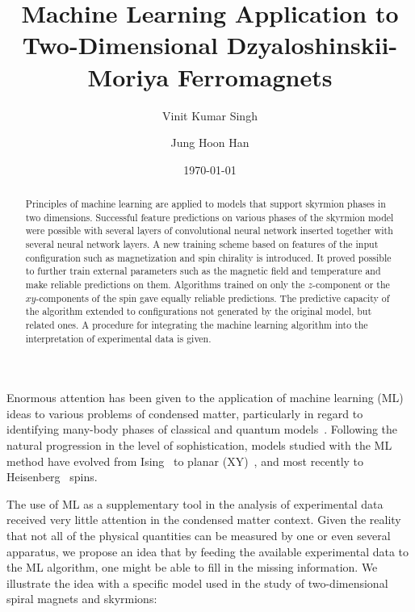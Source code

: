\documentclass[reprint,amsmath,amssymb,aps,showpacs,superscriptaddress,prl]{revtex4-1}
\begin{document}
%
\title{Machine Learning Application to Two-Dimensional Dzyaloshinskii-Moriya Ferromagnets}

\author{Vinit Kumar Singh}
\author{Jung Hoon Han}
\date{\today}

\begin{abstract}
Principles of machine learning are applied to models that support skyrmion phases in two dimensions. Successful feature predictions on various phases of the skyrmion model were possible with several layers of convolutional neural network inserted together with several neural network layers. A new training scheme based on features of the input configuration such as magnetization and spin chirality is introduced. It proved possible to further train external parameters such as the magnetic field and temperature and make reliable predictions on them. Algorithms trained on only the $z$-component or the $xy$-components of the spin gave equally reliable predictions. The predictive capacity of the algorithm extended to configurations not generated by the original model, but related ones. A procedure for integrating the machine learning algorithm into the interpretation of experimental data is given.
\end{abstract}
\maketitle

Enormous attention has been given to the application of machine learning (ML) ideas to various problems of condensed matter, particularly in regard to identifying many-body phases of classical and quantum models~\cite{melko16,wang16,melko17,melko17b,melko17c,tanaka17,scalettar17,wetzel17,wetzel17b,iso18,kim18,zhai17,scalettar17,beach18,zhai18,russian18}.
Following the natural progression in the level of sophistication, models studied with the ML method have evolved from Ising~\cite{melko16,wang16,melko17,melko17b,melko17c,tanaka17,scalettar17,wetzel17,wetzel17b,iso18,kim18} to planar (XY)~\cite{zhai17,scalettar17,wetzel17b,beach18,zhai18}, and most recently to Heisenberg~\cite{russian18} spins. 

The use of ML as a supplementary tool in the analysis of experimental data received very little attention in the condensed matter context. Given the reality that not all of the physical  quantities can be measured by one or even several apparatus, we propose an idea that by feeding the available experimental data to the ML algorithm, one might be able to fill in the missing information. We illustrate the idea with a specific model used in the study of two-dimensional spiral magnets and skyrmions:
\end{document}
